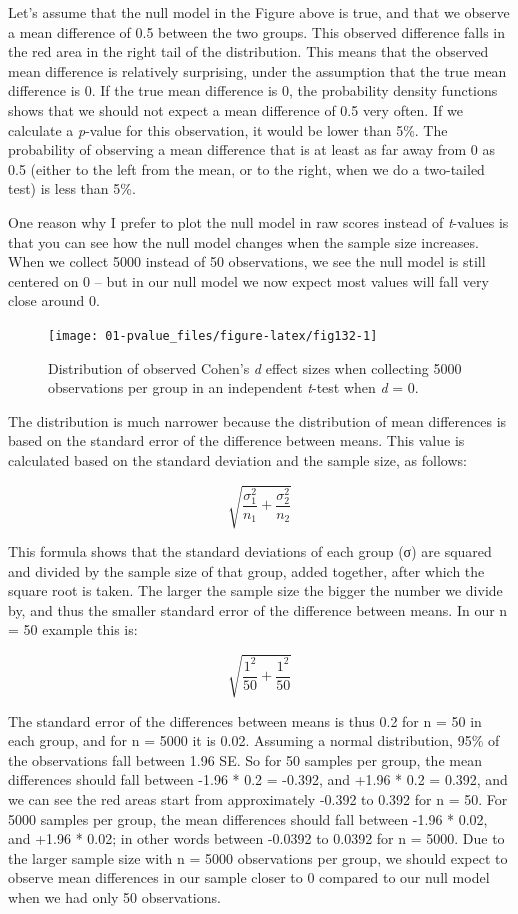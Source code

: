 \documentclass[
  oneside]{krantz}
\begin{document}
Let's assume that the null model in the Figure above is true, and that we observe a mean difference of 0.5 between the two groups. This observed difference falls in the red area in the right tail of the distribution. This means that the observed mean difference is relatively surprising, under the assumption that the true mean difference is 0. If the true mean difference is 0, the probability density functions shows that we should not expect a mean difference of 0.5 very often. If we calculate a \emph{p}-value for this observation, it would be lower than 5\%. The probability of observing a mean difference that is at least as far away from 0 as 0.5 (either to the left from the mean, or to the right, when we do a two-tailed test) is less than 5\%.

One reason why I prefer to plot the null model in raw scores instead of \emph{t}-values is that you can see how the null model changes when the sample size increases. When we collect 5000 instead of 50 observations, we see the null model is still centered on 0 -- but in our null model we now expect most values will fall very close around 0.



\begin{figure}

{\centering \texttt{[image: 01-pvalue\_files/figure-latex/fig132-1]} 

}

\caption{Distribution of observed Cohen's \emph{d} effect sizes when collecting 5000 observations per group in an independent \emph{t}-test when \emph{d} = 0.}\label{fig:fig132}
\end{figure}

The distribution is much narrower because the distribution of mean differences is based on the standard error of the difference between means. This value is calculated based on the standard deviation and the sample size, as follows:

\[\sqrt{\frac{\sigma_{1}^{2}}{n_{1}}+\frac{\sigma_{2}^{2}}{n_{2}}}\]

This formula shows that the standard deviations of each group (σ) are squared and divided by the sample size of that group, added together, after which the square root is taken. The larger the sample size the bigger the number we divide by, and thus the smaller standard error of the difference between means. In our n = 50 example this is:

\[\sqrt{\frac{1^{2}}{50}+\frac{1^{2}}{50}}\]

The standard error of the differences between means is thus 0.2 for n = 50 in each group, and for n = 5000 it is 0.02. Assuming a normal distribution, 95\% of the observations fall between 1.96 SE. So for 50 samples per group, the mean differences should fall between -1.96 * 0.2 = -0.392, and +1.96 * 0.2 = 0.392, and we can see the red areas start from approximately -0.392 to 0.392 for n = 50. For 5000 samples per group, the mean differences should fall between -1.96 * 0.02, and +1.96 * 0.02; in other words between -0.0392 to 0.0392 for n = 5000. Due to the larger sample size with n = 5000 observations per group, we should expect to observe mean differences in our sample closer to 0 compared to our null model when we had only 50 observations.
\end{document}
